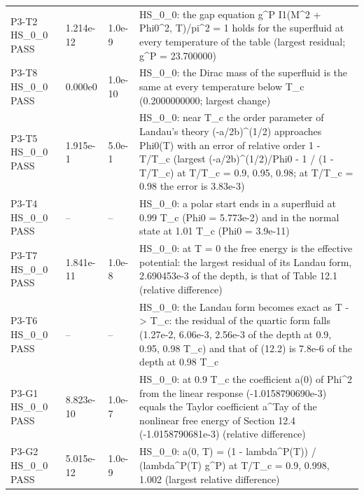 \documentclass[aps,prd,onecolumn,superscriptaddress,nofootinbib,floatfix,longbibliography]{revtex4-2}
\begin{document}
\begin{longtable}{p{}p{}p{}p{}}
P3-T2 HS\_0\_0 \newline PASS & 1.214e-12 & 1.0e-9 & HS\_0\_0: the gap equation g\textasciicircum{}P I1(M\textasciicircum{}2 + Phi0\textasciicircum{}2, T)/pi\textasciicircum{}2 = 1 holds for the superfluid at every temperature of the table (largest \textbar{}residual\textbar{}; g\textasciicircum{}P = 23.700000) \\
P3-T8 HS\_0\_0 \newline PASS & 0.000e0 & 1.0e-10 & HS\_0\_0: the Dirac mass of the superfluid is the same at every temperature below T\_c (0.2000000000; largest change) \\
P3-T5 HS\_0\_0 \newline PASS & 1.915e-1 & 5.0e-1 & HS\_0\_0: near T\_c the order parameter of Landau's theory (-a/2b)\textasciicircum{}(1/2) approaches Phi0(T) with an error of relative order 1 - T/T\_c (largest \textbar{}(-a/2b)\textasciicircum{}(1/2)/Phi0 - 1\textbar{} / (1 - T/T\_c) at T/T\_c = 0.9, 0.95, 0.98; at T/T\_c = 0.98 the error is 3.83e-3) \\
P3-T4 HS\_0\_0 \newline PASS & -- & -- & HS\_0\_0: a polar start ends in a superfluid at 0.99 T\_c (Phi0 = 5.773e-2) and in the normal state at 1.01 T\_c (Phi0 = 3.9e-11) \\
P3-T7 HS\_0\_0 \newline PASS & 1.841e-11 & 1.0e-8 & HS\_0\_0: at T = 0 the free energy is the effective potential: the largest residual of its Landau form, 2.690453e-3 of the depth, is that of Table 12.1 (relative difference) \\
P3-T6 HS\_0\_0 \newline PASS & -- & -- & HS\_0\_0: the Landau form becomes exact as T -\textgreater{} T\_c: the residual of the quartic form falls (1.27e-2, 6.06e-3, 2.56e-3 of the depth at 0.9, 0.95, 0.98 T\_c) and that of (12.2) is 7.8e-6 of the depth at 0.98 T\_c \\
P3-G1 HS\_0\_0 \newline PASS & 8.823e-10 & 1.0e-7 & HS\_0\_0: at 0.9 T\_c the coefficient a(0) of \textbar{}Phi\textbar{}\textasciicircum{}2 from the linear response (-1.0158790690e-3) equals the Taylor coefficient a\textasciicircum{}Tay of the nonlinear free energy of Section 12.4 (-1.0158790681e-3) (relative difference) \\
P3-G2 HS\_0\_0 \newline PASS & 5.015e-12 & 1.0e-9 & HS\_0\_0: a(0, T) = (1 - lambda\textasciicircum{}P(T)) / (lambda\textasciicircum{}P(T) g\textasciicircum{}P) at T/T\_c = 0.9, 0.998, 1.002 (largest relative difference) \\

\end{longtable}
\end{document}
